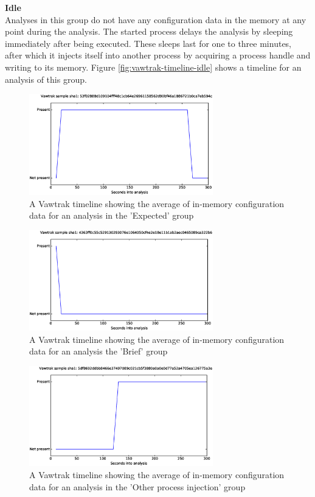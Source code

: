 \documentclass[conference]{IEEEtran}
\begin{document}
\textbf{Idle}
\\Analyses in this group do not have any configuration data in the memory at any point during the analysis. The started process delays the analysis by sleeping immediately after  being executed. These sleeps last for one to three minutes, after which it injects itself into another process by acquiring a process handle and writing to its memory. Figure \ref{fig:vawtrak-timeline-idle} shows a timeline for an analysis of this group.
\newpage

\begin{figure}[h]
    \includegraphics[width=8cm,scale=0.5]{images/vawtrak/vawtrak-timelines-eps/Vawtrak-53f02888d109104fff48c1cb64e26961158562d90bf46a1886721b0ca7eb594c.eps}
    \caption{A Vawtrak timeline showing the average of in-memory configuration data for an analysis in the 'Expected' group}
    \label{fig:vawtrak-timeline-normal}
\end{figure}
\begin{figure}[h]
    \includegraphics[width=8cm,scale=0.5]{images/vawtrak/vawtrak-timelines-eps/Vawtrak-4363ff0c55c529130293076e1064050cf4e2e18e11b1ab2aec0465089ca322b6.eps}
    \caption{A Vawtrak timeline showing the average of in-memory configuration data for an analysis the 'Brief' group}
    \label{fig:vawtrak-timeline-brief}
\end{figure}
\begin{figure}[!h]
    \includegraphics[width=8cm,scale=0.5]{images/vawtrak/vawtrak-timelines-eps/Vawtrak-5df8692ddbb8466e37497089c021cb5f3880a0a0e0d77a52a4705ea126775a3e.eps}
    \caption{A Vawtrak timeline showing the average of in-memory configuration data for an analysis in the 'Other process injection' group}
    \label{fig:vawtrak-timeline-injection}
\end{figure}
\end{document}
